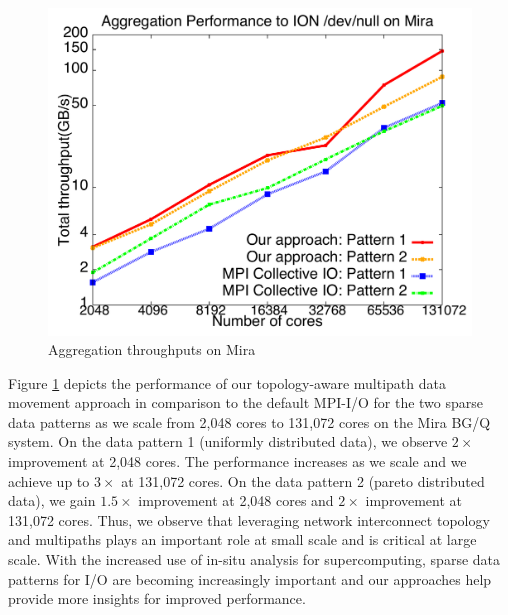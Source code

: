 \begin{figure}[!htb]
\vspace{-0.1in}
\centering
\includegraphics[scale=0.3]{figures/mira_agg.pdf}
\vspace{-0.2in}
\caption{Aggregation throughputs on Mira}
\vspace{-0.2in}
\label{fig:mira_agg}
\end{figure}

Figure \ref{fig:mira_agg} depicts the performance of our topology-aware multipath data movement approach in comparison to the default MPI-I/O for the two sparse data patterns as we scale from 2,048 cores to 131,072 cores on the Mira BG/Q system. On the data pattern 1 (uniformly distributed data), we observe  $2\times$ improvement at 2,048 cores. The performance increases as we scale and we achieve up to $3\times$ at 131,072 cores. On the data pattern 2 (pareto distributed data), we gain $1.5\times$ improvement at 2,048 cores and $2\times$ improvement at 131,072 cores. Thus, we observe that leveraging network interconnect topology and multipaths plays an important role at small scale and is critical at large scale. With the increased use of in-situ analysis for supercomputing,  sparse data patterns for I/O are becoming increasingly important and our approaches help provide more insights for improved performance.